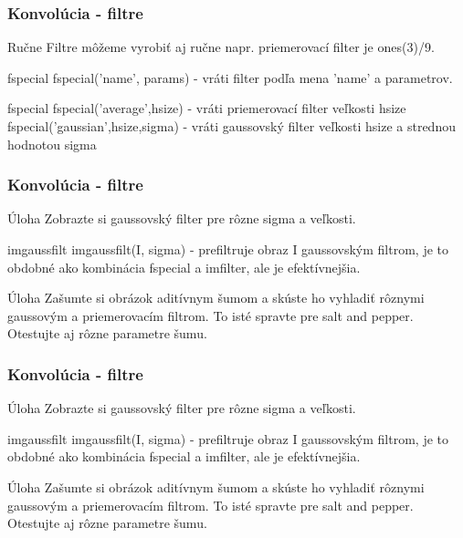 \documentclass{beamer}
\begin{document}
\begin{frame}
\frametitle{Konvolúcia - filtre}
\begin{block}{Ručne}
Filtre môžeme vyrobiť aj ručne napr. priemerovací filter je ones(3)/9.
\end{block}

\begin{block}{fspecial}
fspecial('name', params) - vráti filter podľa mena 'name' a parametrov.
\end{block}

\begin{block}{fspecial}
fspecial('average',hsize) - vráti priemerovací filter veľkosti hsize \\
fspecial('gaussian',hsize,sigma) - vráti gaussovský filter veľkosti hsize a strednou hodnotou sigma
\end{block}
\end{frame}

\begin{frame}
\frametitle{Konvolúcia - filtre}
\begin{block}{Úloha}
Zobrazte si gaussovský filter pre rôzne sigma a veľkosti.
\end{block}

\begin{block}{imgaussfilt}
imgaussfilt(I, sigma) - prefiltruje obraz I gaussovským filtrom, je to obdobné ako kombinácia fspecial a imfilter, ale je efektívnejšia.
\end{block}

\begin{block}{Úloha}
Zašumte si obrázok aditívnym šumom a skúste ho vyhladiť rôznymi gaussovým a priemerovacím filtrom. To isté spravte pre salt and pepper. Otestujte aj rôzne parametre šumu.
\end{block}
\end{frame}

\begin{frame}
\frametitle{Konvolúcia - filtre}
\begin{block}{Úloha}
Zobrazte si gaussovský filter pre rôzne sigma a veľkosti.
\end{block}

\begin{block}{imgaussfilt}
imgaussfilt(I, sigma) - prefiltruje obraz I gaussovským filtrom, je to obdobné ako kombinácia fspecial a imfilter, ale je efektívnejšia.
\end{block}

\begin{block}{Úloha}
Zašumte si obrázok aditívnym šumom a skúste ho vyhladiť rôznymi gaussovým a priemerovacím filtrom. To isté spravte pre salt and pepper. Otestujte aj rôzne parametre šumu.
\end{block}
\end{frame}
\end{document}
